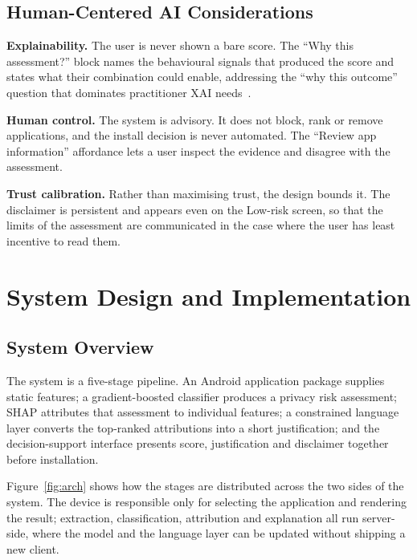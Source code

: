 \documentclass[sigconf]{acmart}
\begin{document}
\subsection{Human-Centered AI Considerations}

\textbf{Explainability.} The user is never shown a bare score. The ``Why
this assessment?'' block names the behavioural signals that produced the
score and states what their combination could enable, addressing the ``why
this outcome'' question that dominates practitioner XAI
needs~\cite{liao2020questioning}.

\textbf{Human control.} The system is advisory. It does not block, rank or
remove applications, and the install decision is never automated. The
``Review app information'' affordance lets a user inspect the evidence and
disagree with the assessment.

\textbf{Trust calibration.} Rather than maximising trust, the design bounds
it. The disclaimer is persistent and appears even on the Low-risk screen,
so that the limits of the assessment are communicated in the case where the
user has least incentive to read them.

\section{System Design and Implementation}

\subsection{System Overview}

The system is a five-stage pipeline. An Android application package
supplies static features; a gradient-boosted classifier produces a privacy
risk assessment; SHAP attributes that assessment to individual features; a
constrained language layer converts the top-ranked attributions into a
short justification; and the decision-support interface presents score,
justification and disclaimer together before installation.

Figure~\ref{fig:arch} shows how the stages are distributed across the two
sides of the system. The device is responsible only for selecting the
application and rendering the result; extraction, classification,
attribution and explanation all run server-side, where the model and the
language layer can be updated without shipping a new client.
\end{document}
